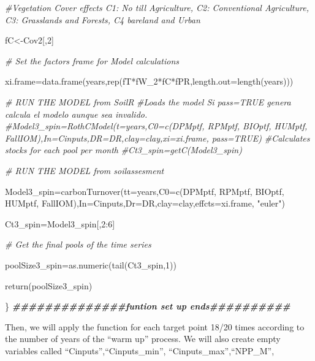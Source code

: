 \documentclass[
  10pt,
  b5paper,
]{book}
\newenvironment{Shaded}{\begin{snugshade}}{\end{snugshade}}
\newcommand{\AttributeTok}[1]{\textcolor[rgb]{0.77,0.63,0.00}{#1}}
\newcommand{\CommentTok}[1]{\textcolor[rgb]{0.56,0.35,0.01}{\textit{#1}}}
\newcommand{\DecValTok}[1]{\textcolor[rgb]{0.00,0.00,0.81}{#1}}
\newcommand{\DocumentationTok}[1]{\textcolor[rgb]{0.56,0.35,0.01}{\textbf{\textit{#1}}}}
\newcommand{\FunctionTok}[1]{\textcolor[rgb]{0.00,0.00,0.00}{#1}}
\newcommand{\NormalTok}[1]{#1}
\newcommand{\OtherTok}[1]{\textcolor[rgb]{0.56,0.35,0.01}{#1}}
\newcommand{\SpecialCharTok}[1]{\textcolor[rgb]{0.00,0.00,0.00}{#1}}
\newcommand{\StringTok}[1]{\textcolor[rgb]{0.31,0.60,0.02}{#1}}
\begin{document}
\begin{Shaded}
\begin{Highlighting}[]
\CommentTok{\#Vegetation Cover effects  C1: No till Agriculture, C2: Conventional Agriculture, C3: Grasslands and Forests, C4 bareland and Urban}

\NormalTok{fC}\OtherTok{\textless{}{-}}\NormalTok{Cov2[,}\DecValTok{2}\NormalTok{]}

\CommentTok{\# Set the factors frame for Model calculations}

\NormalTok{xi.frame}\OtherTok{=}\FunctionTok{data.frame}\NormalTok{(years,}\FunctionTok{rep}\NormalTok{(fT}\SpecialCharTok{*}\NormalTok{fW\_2}\SpecialCharTok{*}\NormalTok{fC}\SpecialCharTok{*}\NormalTok{fPR,}\AttributeTok{length.out=}\FunctionTok{length}\NormalTok{(years)))}

\CommentTok{\# RUN THE MODEL from SoilR}
\CommentTok{\#Loads the model Si pass=TRUE genera calcula el modelo aunque sea invalido. }
\CommentTok{\#Model3\_spin=RothCModel(t=years,C0=c(DPMptf, RPMptf, BIOptf, HUMptf, FallIOM),In=Cinputs,DR=DR,clay=clay,xi=xi.frame, pass=TRUE) }
\CommentTok{\#Calculates stocks for each pool per month}
\CommentTok{\#Ct3\_spin=getC(Model3\_spin)}

\CommentTok{\# RUN THE MODEL from soilassesment}

\NormalTok{Model3\_spin}\OtherTok{=}\FunctionTok{carbonTurnover}\NormalTok{(}\AttributeTok{tt=}\NormalTok{years,}\AttributeTok{C0=}\FunctionTok{c}\NormalTok{(DPMptf, RPMptf, BIOptf, HUMptf, FallIOM),}\AttributeTok{In=}\NormalTok{Cinputs,}\AttributeTok{Dr=}\NormalTok{DR,}\AttributeTok{clay=}\NormalTok{clay,}\AttributeTok{effcts=}\NormalTok{xi.frame, }\StringTok{"euler"}\NormalTok{) }

\NormalTok{Ct3\_spin}\OtherTok{=}\NormalTok{Model3\_spin[,}\DecValTok{2}\SpecialCharTok{:}\DecValTok{6}\NormalTok{]}

\CommentTok{\# Get the final pools of the time series}

\NormalTok{poolSize3\_spin}\OtherTok{=}\FunctionTok{as.numeric}\NormalTok{(}\FunctionTok{tail}\NormalTok{(Ct3\_spin,}\DecValTok{1}\NormalTok{))}

\FunctionTok{return}\NormalTok{(poolSize3\_spin)}

\NormalTok{\}}
\DocumentationTok{\#\#\#\#\#\#\#\#\#\#\#\#\#\#funtion set up ends\#\#\#\#\#\#\#\#\#\#}
\end{Highlighting}
\end{Shaded}

Then, we will apply the function for each target point 18/20 times according to the number of years of the ``warm up'' process. We will also create empty variables called ``Cinputs'',``Cinputs\_min'', ``Cinputs\_max'',``NPP\_M'',
\end{document}
